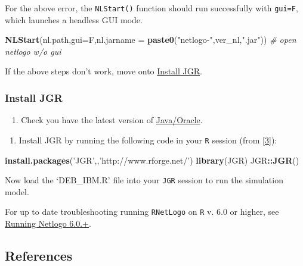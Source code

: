\documentclass[10,portrait]{article}
\newenvironment{Shaded}{\begin{snugshade}}{\end{snugshade}}
\newcommand{\KeywordTok}[1]{\textcolor[rgb]{0.13,0.29,0.53}{\textbf{#1}}}
\newcommand{\DataTypeTok}[1]{\textcolor[rgb]{0.13,0.29,0.53}{#1}}
\newcommand{\StringTok}[1]{\textcolor[rgb]{0.31,0.60,0.02}{#1}}
\newcommand{\CommentTok}[1]{\textcolor[rgb]{0.56,0.35,0.01}{\textit{#1}}}
\newcommand{\OperatorTok}[1]{\textcolor[rgb]{0.81,0.36,0.00}{\textbf{#1}}}
\newcommand{\NormalTok}[1]{#1}
\providecommand{\tightlist}{%
  \setlength{\itemsep}{0pt}\setlength{\parskip}{0pt}}
\begin{document}
For the above error, the \texttt{NLStart()} function should run
successfully with \texttt{gui=F}, which launches a headless GUI mode.

\begin{Shaded}
\begin{Highlighting}[]
\KeywordTok{NLStart}\NormalTok{(nl.path,}\DataTypeTok{gui=}\NormalTok{F,}\DataTypeTok{nl.jarname =} \KeywordTok{paste0}\NormalTok{(}\StringTok{"netlogo-"}\NormalTok{,ver_nl,}\StringTok{".jar"}\NormalTok{)) }\CommentTok{# open netlogo w/o gui}
\end{Highlighting}
\end{Shaded}

If the above steps don't work, move onto
\protect\hyperlink{install-jgr}{Install JGR}.

\hypertarget{install-jgr}{\subsubsection{Install
JGR}\label{install-jgr}}

~ 1. Check you have the latest version of
\href{https://www.oracle.com/technetwork/java/javase/downloads/index-jsp-138363.html}{Java/Oracle}.

\begin{enumerate}
\def\labelenumi{\arabic{enumi}.}
\setcounter{enumi}{1}
\tightlist
\item
  Install JGR by running the following code in your \texttt{R} session
  (from \protect\hyperlink{references}{{[}3{]}}):
\end{enumerate}

\begin{Shaded}
\begin{Highlighting}[]
\KeywordTok{install.packages}\NormalTok{(}\StringTok{'JGR'}\NormalTok{,,}\StringTok{'http://www.rforge.net/'}\NormalTok{)}
\KeywordTok{library}\NormalTok{(JGR)}
\NormalTok{JGR}\OperatorTok{::}\KeywordTok{JGR}\NormalTok{()}
\end{Highlighting}
\end{Shaded}

Now load the `DEB\_IBM.R' file into your \texttt{JGR} session to run the
simulation model.

For up to date troubleshooting running \texttt{RNetLogo} on \texttt{R}
v. 6.0 or higher, see
\href{https://github.com/NetLogo/NetLogo/issues/1282}{Running Netlogo
6.0.+}.

\hypertarget{references}{\subsection{References}\label{references}}
\end{document}
